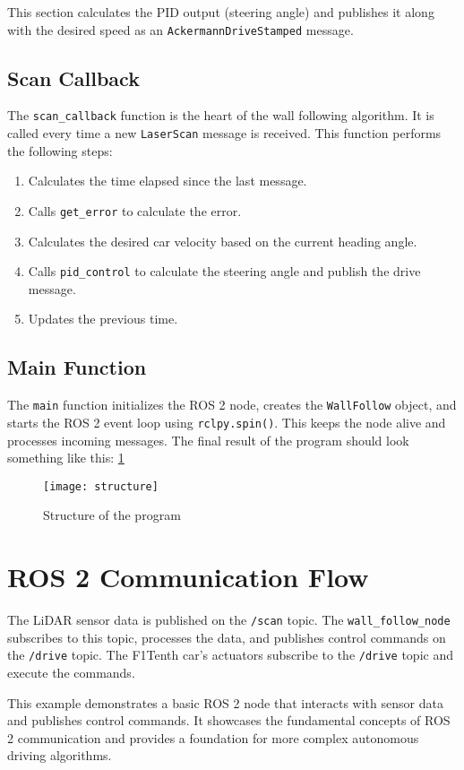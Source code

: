 This section calculates the PID output (steering angle) and publishes it along with the desired speed as an \texttt{AckermannDriveStamped} message.

\subsection{Scan Callback}

The \texttt{scan\_callback} function is the heart of the wall following algorithm.  It is called every time a new \texttt{LaserScan} message is received.  This function performs the following steps:

\begin{enumerate}
    \item Calculates the time elapsed since the last message.
    \item Calls \texttt{get\_error} to calculate the error.
    \item Calculates the desired car velocity based on the current heading angle.
    \item Calls \texttt{pid\_control} to calculate the steering angle and publish the drive message.
    \item Updates the previous time.
\end{enumerate}

\subsection{Main Function}

The \texttt{main} function initializes the ROS 2 node, creates the \texttt{WallFollow} object, and starts the ROS 2 event loop using \texttt{rclpy.spin()}.  This keeps the node alive and processes incoming messages. The final result of the program should look something like this: \ref{fig:struct}

\begin{figure}
    \centering
    \texttt{[image: structure]}
    \caption{Structure of the program}
    \label{fig:struct}
\end{figure}

\section{ROS 2 Communication Flow}

The LiDAR sensor data is published on the \texttt{/scan} topic.  The \texttt{wall\_follow\_node} subscribes to this topic, processes the data, and publishes control commands on the \texttt{/drive} topic.  The F1Tenth car's actuators subscribe to the \texttt{/drive} topic and execute the commands.

This example demonstrates a basic ROS 2 node that interacts with sensor data and publishes control commands. It showcases the fundamental concepts of ROS 2 communication and provides a foundation for more complex autonomous driving algorithms.